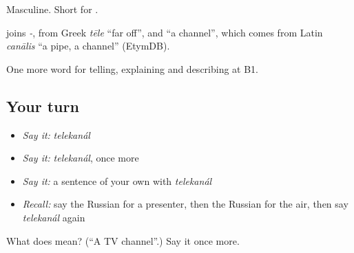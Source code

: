 Masculine. Short for \emph{ }.

\begin{cousinweb}
\emph{} joins \emph{-}, from Greek \emph{tēle} \textquotedblleft{}far off\textquotedblright{}, and \emph{} \textquotedblleft{}a channel\textquotedblright{}, which comes from Latin \emph{canālis} \textquotedblleft{}a pipe, a channel\textquotedblright{} (EtymDB).
\end{cousinweb}

\begin{grammarlens}[title={What you've built}]
One more word for telling, explaining and describing at B1.
\end{grammarlens}

\subsection*{Your turn}
\begin{itemize}
\raggedright
  \item \emph{Say it:} \emph{telekanál}
  \item \emph{Say it:} \emph{telekanál}, once more
  \item \emph{Say it:} a sentence of your own with \emph{telekanál}
  \item \emph{Recall:} say the Russian for a presenter, then the Russian for the air, then say \emph{telekanál} again
\end{itemize}

\begin{tcolorbox}[breakable,colback=teal!4,colframe=teal!35!black,title={Before you move on}]
What does  mean? (\textquotedblleft{}A TV channel\textquotedblright{}.) Say it once more.
\end{tcolorbox}
